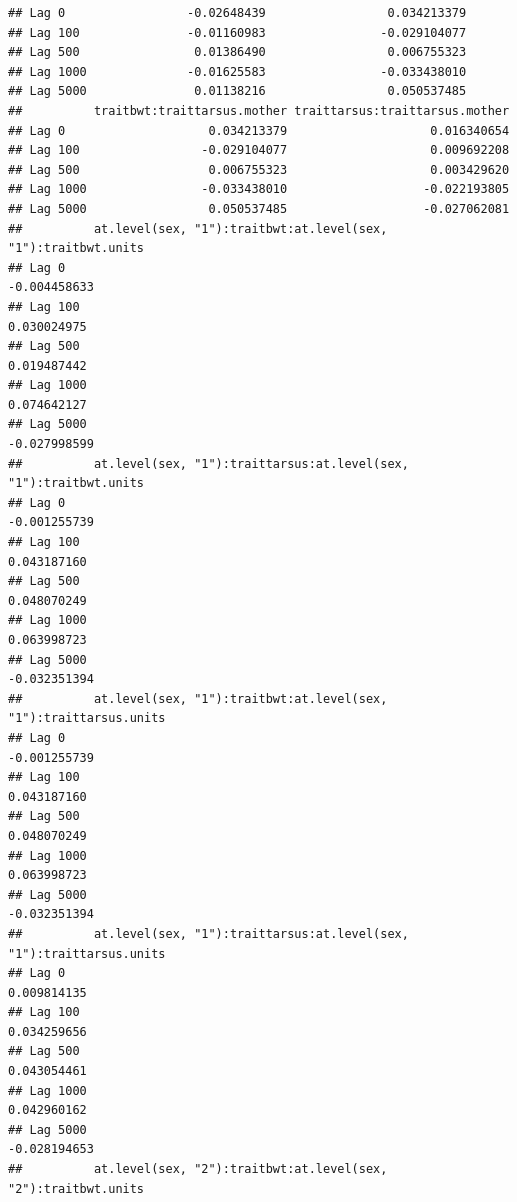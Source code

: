 \documentclass[
  12pt,
]{book}
\begin{document}
\begin{verbatim}
## Lag 0                 -0.02648439                 0.034213379
## Lag 100               -0.01160983                -0.029104077
## Lag 500                0.01386490                 0.006755323
## Lag 1000              -0.01625583                -0.033438010
## Lag 5000               0.01138216                 0.050537485
##          traitbwt:traittarsus.mother traittarsus:traittarsus.mother
## Lag 0                    0.034213379                    0.016340654
## Lag 100                 -0.029104077                    0.009692208
## Lag 500                  0.006755323                    0.003429620
## Lag 1000                -0.033438010                   -0.022193805
## Lag 5000                 0.050537485                   -0.027062081
##          at.level(sex, "1"):traitbwt:at.level(sex, "1"):traitbwt.units
## Lag 0                                                     -0.004458633
## Lag 100                                                    0.030024975
## Lag 500                                                    0.019487442
## Lag 1000                                                   0.074642127
## Lag 5000                                                  -0.027998599
##          at.level(sex, "1"):traittarsus:at.level(sex, "1"):traitbwt.units
## Lag 0                                                        -0.001255739
## Lag 100                                                       0.043187160
## Lag 500                                                       0.048070249
## Lag 1000                                                      0.063998723
## Lag 5000                                                     -0.032351394
##          at.level(sex, "1"):traitbwt:at.level(sex, "1"):traittarsus.units
## Lag 0                                                        -0.001255739
## Lag 100                                                       0.043187160
## Lag 500                                                       0.048070249
## Lag 1000                                                      0.063998723
## Lag 5000                                                     -0.032351394
##          at.level(sex, "1"):traittarsus:at.level(sex, "1"):traittarsus.units
## Lag 0                                                            0.009814135
## Lag 100                                                          0.034259656
## Lag 500                                                          0.043054461
## Lag 1000                                                         0.042960162
## Lag 5000                                                        -0.028194653
##          at.level(sex, "2"):traitbwt:at.level(sex, "2"):traitbwt.units

\end{verbatim}
\end{document}
